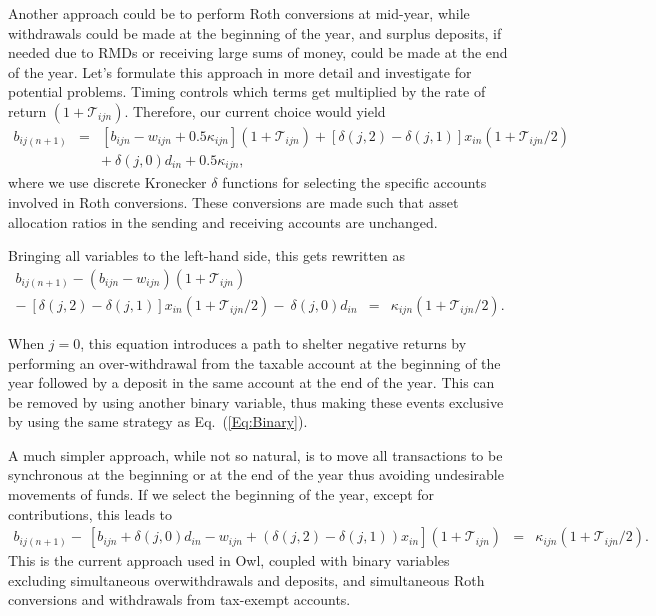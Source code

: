 \documentclass{report}[fleqn,12pt]
\begin{document}
	Another approach could be to perform Roth conversions at mid-year, while withdrawals
	could be made at the beginning of the year, and surplus deposits,
	if needed due to RMDs or receiving large sums of money,
	could be made at the end of the year. Let's formulate this approach
	in more detail and investigate for potential problems.
	Timing controls which terms get multiplied by the rate of return $(1 + \mathcal{T}_{ijn})$.
	Therefore, our current choice would yield
	\begin{eqnarray}
		\label{Eq:C3a}
		b_{ij(n+1)} &=& [b_{ijn} - w_{ijn} + 0.5\kappa_{ijn}](1 + \mathcal{T}_{ijn})
		+ [\delta(j, 2) - \delta(j, 1)]x_{in} (1 + \mathcal{T}_{ijn}/2)
		\nonumber \\
		&& 
		+\ \delta(j, 0) d_{in} + 0.5 \kappa_{ijn},
	\end{eqnarray}
	where we use discrete Kronecker $\delta$ functions for selecting the specific accounts involved
	in Roth conversions. These conversions are made such that asset allocation
	ratios in the sending and receiving accounts are unchanged.

	Bringing all variables
	to the left-hand side, this gets rewritten as
	\begin{eqnarray}
		\label{Eq:C3}
		b_{ij(n+1)} - (b_{ijn} - w_{ijn}) (1 + \mathcal{T}_{ijn})
		&& \nonumber \\
		-\ [\delta(j, 2) - \delta(j, 1)]x_{in}(1 + \mathcal{T}_{ijn}/2)
		-\ \delta(j, 0) d_{in}
		&=& \kappa_{ijn} (1 + \mathcal{T}_{ijn}/2).
	\end{eqnarray}

	When $j=0$, this equation introduces
	a path to shelter negative returns by performing an over-withdrawal from the taxable
	account at the beginning of the year followed by a deposit in the
	same account at the end of the year. This can 
	be removed by using another binary variable, thus making these events exclusive by using
	the same strategy as Eq.~(\ref{Eq:Binary}).

	A much simpler approach, while not so natural,
	is to move all transactions to be synchronous at the beginning or at the end of the year
	thus avoiding undesirable movements of funds.
	If we select the beginning of the year, except for contributions, this leads to
	\begin{eqnarray}
		\label{Eq:C3b}
		b_{ij(n+1)}
		- \ [b_{ijn} + \delta(j, 0)d_{in} - w_{ijn} + (\delta(j, 2) - \delta(j, 1))x_{in}]
		(1 + \mathcal{T}_{ijn})
		&=& \kappa_{ijn} (1 + \mathcal{T}_{ijn}/2).
		\nonumber
	\end{eqnarray}
This is the current approach used in Owl, coupled with
binary variables excluding simultaneous overwithdrawals and deposits, and
simultaneous Roth conversions and withdrawals from tax-exempt accounts.
\end{document}

